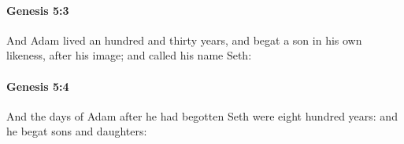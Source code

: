 		\paragraph{Genesis 5:3} %
			\label{GENESIS-5-3}

			And Adam lived an hundred and thirty years, and begat a son in his own likeness, after his image; and called his name Seth:


		\paragraph{Genesis 5:4} %
			\label{GENESIS-5-4}

			And the days of Adam after he had begotten Seth were eight hundred years: and he begat sons and daughters:


